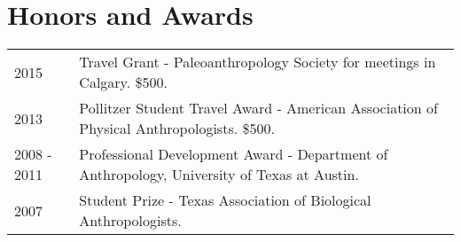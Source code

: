 \documentclass{article}
\begin{document}
\section*{Honors and Awards}

\begin{tabular}{p{}p{}}
2015 & Travel Grant - Paleoanthropology Society for meetings in Calgary. \$500.\\[4pt]
2013 & Pollitzer Student Travel Award - American Association of Physical Anthropologists. \$500.\\[4pt]
2008 - 2011 & Professional Development Award - Department of Anthropology, University of Texas at Austin.\\[4pt]
2007 & Student Prize - Texas Association of Biological Anthropologists.\\
\end{tabular}
\end{document}
